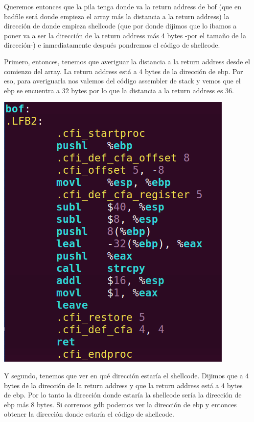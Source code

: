 \documentclass[11pt]{article}
\begin{document}
Queremos entonces que la pila tenga donde va la return address de bof
(que en badfile será donde empieza el array más la distancia a la return address) 
la dirección de donde empieza shellcode (que por donde dijimos que lo ibamos a poner va a ser la 
dirección de la return address más 4 bytes -por el tamaño de la dirección-) 
e inmediatamente después pondremos el código de shellcode. 

Primero, entonces, tenemos que averiguar la distancia a la return address desde el comienzo del array. 
La return address está a 4 bytes de la dirección de ebp. 
Por eso, para averiguarla nos valemos del código assembler de stack
y vemos que el ebp se encuentra a 32 bytes por lo que la distancia a la return address es 36.

\begin{center}
\includegraphics[scale=0.7]{loadeffectiveaddress.png}
\end{center}

Y segundo, tenemos que ver en qué dirección estaría el shellcode. Dijimos que a 4 bytes de la dirección de 
la return address y que la return address está a 4 bytes de ebp. Por lo tanto la dirección donde estaría la
shellcode sería la dirección de ebp más 8 bytes. Si corremos gdb podemos ver la dirección de ebp y entonces
obtener la dirección donde estaría el código de shellcode. 
\end{document}
